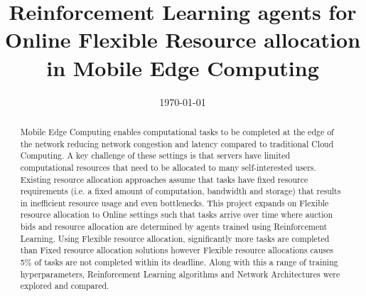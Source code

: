 \documentclass[sotoncolour]{extra/uos_project}     %
\title       {Reinforcement Learning agents for Online Flexible Resource allocation in Mobile Edge Computing}
\date       {\today}
\begin{document}
\frontmatter
\maketitle
\begin{abstract}
  Mobile Edge Computing enables computational tasks to be completed at the edge of the network reducing
  network congestion and latency compared to traditional Cloud Computing. A key challenge of these settings is that
  servers have limited computational resources that need to be allocated to many self-interested users. Existing
  resource allocation approaches assume that tasks have fixed resource requirements (i.e. a fixed amount of
  computation, bandwidth and storage) that results in inefficient resource usage and even bottlenecks.
  This project expands on Flexible resource allocation to Online settings such that tasks arrive over time where auction
  bids and resource allocation are determined by agents trained using Reinforcement Learning.
  Using Flexible resource allocation, significantly more tasks are completed than Fixed resource allocation solutions
  however Flexible resource allocations causes 5\% of tasks are not completed within its deadline.
  Along with this a range of training hyperparameters, Reinforcement Learning algorithms and Network Architectures were
  explored and compared.
\end{abstract}

\tableofcontents
\listoffigures
\listoftables

\end{document}
